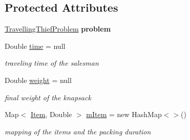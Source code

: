 \subsection*{Protected Attributes}
\begin{DoxyCompactItemize}
\item 
\hypertarget{classcom_1_1msu_1_1thief_1_1evaluator_1_1time_1_1TimeEvaluator_a47bbfd6b153b0b4baf5d5378cd41ed61}{\hyperlink{classcom_1_1msu_1_1thief_1_1problems_1_1TravellingThiefProblem}{Travelling\-Thief\-Problem} {\bfseries problem}}\label{classcom_1_1msu_1_1thief_1_1evaluator_1_1time_1_1TimeEvaluator_a47bbfd6b153b0b4baf5d5378cd41ed61}

\item 
\hypertarget{classcom_1_1msu_1_1thief_1_1evaluator_1_1time_1_1TimeEvaluator_ab9023ee339852c4736395dc9cd8fe219}{Double \hyperlink{classcom_1_1msu_1_1thief_1_1evaluator_1_1time_1_1TimeEvaluator_ab9023ee339852c4736395dc9cd8fe219}{time} = null}\label{classcom_1_1msu_1_1thief_1_1evaluator_1_1time_1_1TimeEvaluator_ab9023ee339852c4736395dc9cd8fe219}

\begin{DoxyCompactList}\small\item\em traveling time of the salesman \end{DoxyCompactList}\item 
\hypertarget{classcom_1_1msu_1_1thief_1_1evaluator_1_1time_1_1TimeEvaluator_a440dd0dfafd4d1bb162987966680677e}{Double \hyperlink{classcom_1_1msu_1_1thief_1_1evaluator_1_1time_1_1TimeEvaluator_a440dd0dfafd4d1bb162987966680677e}{weight} = null}\label{classcom_1_1msu_1_1thief_1_1evaluator_1_1time_1_1TimeEvaluator_a440dd0dfafd4d1bb162987966680677e}

\begin{DoxyCompactList}\small\item\em final weight of the knapsack \end{DoxyCompactList}\item 
\hypertarget{classcom_1_1msu_1_1thief_1_1evaluator_1_1time_1_1TimeEvaluator_a9db8192f4769aaa538cccc41d230bc27}{Map$<$ \hyperlink{classcom_1_1msu_1_1thief_1_1model_1_1Item}{Item}, Double $>$ \hyperlink{classcom_1_1msu_1_1thief_1_1evaluator_1_1time_1_1TimeEvaluator_a9db8192f4769aaa538cccc41d230bc27}{m\-Item} = new Hash\-Map$<$$>$()}\label{classcom_1_1msu_1_1thief_1_1evaluator_1_1time_1_1TimeEvaluator_a9db8192f4769aaa538cccc41d230bc27}

\begin{DoxyCompactList}\small\item\em mapping of the items and the packing duration \end{DoxyCompactList}\end{DoxyCompactItemize}


